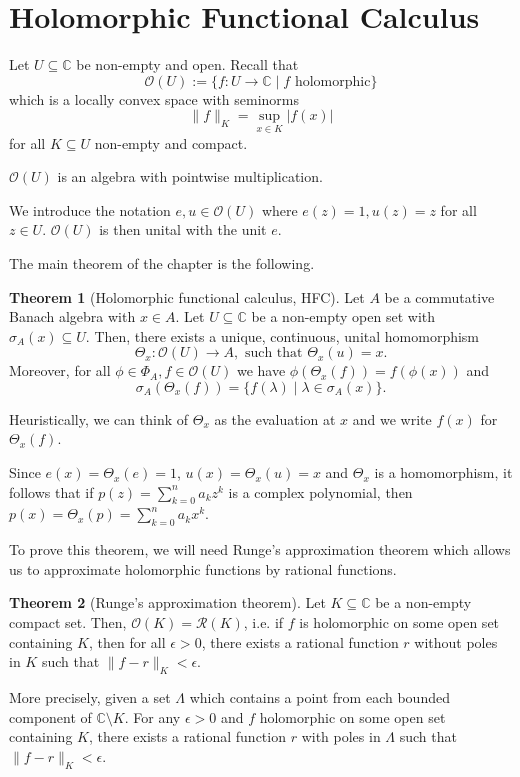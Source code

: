 \documentclass[]{article}
\theoremstyle{definition}
\newtheorem{theorem}{Theorem}
\begin{document}
\newpage
\section{Holomorphic Functional Calculus}

Let \(U \subseteq \mathbb{C}\) be non-empty and open. Recall that 
\[\mathcal{O}(U) := \{f : U \to \mathbb{C} \mid f \text{ holomorphic}\}\]
which is a locally convex space with seminorms 
\[\|f\|_K = \sup_{x \in K} |f(x)|\]
for all \(K \subseteq U\) non-empty and compact.

\(\mathcal{O}(U)\) is an algebra with pointwise multiplication.

We introduce the notation \(e, u \in \mathcal{O}(U)\) where \(e(z) = 1, u(z) = z\) 
for all \(z \in U\). \(\mathcal{O}(U)\) is then unital with the unit \(e\).

The main theorem of the chapter is the following.

\begin{theorem}[Holomorphic functional calculus, HFC]
  Let \(A\) be a commutative Banach algebra with \(x \in A\). Let \(U \subseteq \mathbb{C}\) be 
  a non-empty open set with \(\sigma_A(x) \subseteq U\). Then, there exists a unique, continuous, 
  unital homomorphism 
  \[\Theta_x : \mathcal{O}(U) \to A, \text{ such that } \Theta_x(u) = x.\]
  Moreover, for all \(\phi \in \Phi_A, f \in \mathcal{O}(U)\) we have \(\phi(\Theta_x(f)) = f(\phi(x))\)
  and 
  \[\sigma_A(\Theta_x(f)) = \{f(\lambda) \mid \lambda \in \sigma_A(x)\}.\]
\end{theorem}

Heuristically, we can think of \(\Theta_x\) as the evaluation at \(x\) and we write \(f(x)\) for 
\(\Theta_x(f)\).

Since \(e(x) = \Theta_x(e) = 1\), \(u(x) = \Theta_x(u) = x\) and \(\Theta_x\) is a homomorphism, 
it follows that if \(p(z) = \sum_{k = 0}^n a_k z^k\) is a complex polynomial, then 
\(p(x) = \Theta_x(p) = \sum_{k = 0}^n a_k x^k\).

To prove this theorem, we will need Runge's approximation theorem which allows us to approximate
holomorphic functions by rational functions. 

\begin{theorem}[Runge's approximation theorem]
  Let \(K \subseteq \mathbb{C}\) be a non-empty compact set. Then, \(\mathcal{O}(K) = \mathcal{R}(K)\), 
  i.e. if \(f\) is holomorphic on some open set containing \(K\), then for all \(\epsilon > 0\), 
  there exists a rational function \(r\) without poles in \(K\) such that \(\|f - r\|_K < \epsilon\). 

  More precisely, given a set \(\Lambda\) which contains a point from each bounded component of 
  \(\mathbb{C} \setminus K\). For any \(\epsilon > 0\) and \(f\) holomorphic on some open set 
  containing \(K\), there exists a rational function \(r\) with poles in \(\Lambda\) such that 
  \(\|f - r\|_K < \epsilon\).
\end{theorem}
\end{document}
